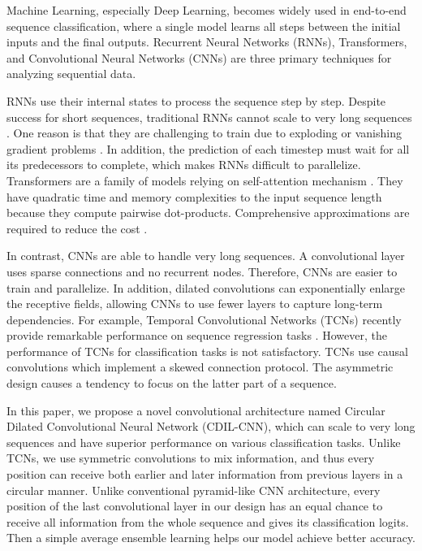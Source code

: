 \documentclass{article}
\begin{document}
Machine Learning, especially Deep Learning, becomes widely used in end-to-end sequence classification, where a single model learns all steps between the initial inputs and the final outputs. Recurrent Neural Networks (RNNs), Transformers, and Convolutional Neural Networks (CNNs) are three primary techniques for analyzing sequential data.

RNNs use their internal states to process the sequence step by step. Despite success for short sequences, traditional RNNs cannot scale to very long sequences \cite{li2018independently}. One reason is that they are challenging to train due to exploding or vanishing gradient problems \cite{bengio1994learning}. In addition, the prediction of each timestep must wait for all its predecessors to complete, which makes RNNs difficult to parallelize. Transformers are a family of models relying on self-attention mechanism \cite{bahdanau2014neural, vaswani2017attention}. They have quadratic time and memory complexities to the input sequence length because they compute pairwise dot-products. Comprehensive approximations are required to reduce the cost \cite{tay2020efficient}.

In contrast, CNNs are able to handle very long sequences. A convolutional layer uses sparse connections and no recurrent nodes. Therefore, CNNs are easier to train and parallelize. In addition, dilated convolutions can exponentially enlarge the receptive fields, allowing CNNs to use fewer layers to capture long-term dependencies. For example, Temporal Convolutional Networks (TCNs) recently provide remarkable performance on sequence regression tasks \cite{bai2018empirical}. However, the performance of TCNs for classification tasks is not satisfactory. TCNs use causal convolutions which implement a skewed connection protocol. The asymmetric design causes a tendency to focus on the latter part of a sequence. 

In this paper, we propose a novel convolutional architecture named Circular Dilated Convolutional Neural Network (CDIL-CNN), which can scale to very long sequences and have superior performance on various classification tasks. Unlike TCNs, we use symmetric convolutions to mix information, and thus every position can receive both earlier and later information from previous layers in a circular manner. Unlike conventional pyramid-like CNN architecture, every position of the last convolutional layer in our design has an equal chance to receive all information from the whole sequence and gives its classification logits. Then a simple average ensemble learning helps our model achieve better accuracy.
\end{document}
